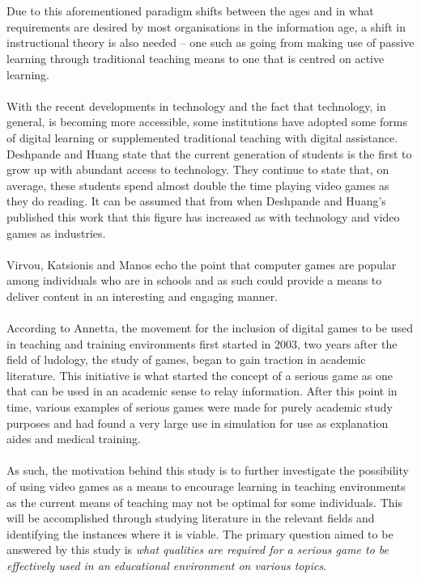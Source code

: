 \documentclass[conference]{IEEEtran}
\begin{document}
\\\\
Due to this aforementioned paradigm shifts between the ages and in what requirements are desired by most organisations in the information age, a shift in instructional theory is also needed – one such as going from making use of passive learning through traditional teaching means to one that is centred on active learning\cite{Reigeluth1996}.
\\\\
With the recent developments in technology and the fact that technology, in general, is becoming more accessible, some institutions have adopted some forms of digital learning or supplemented traditional teaching with digital assistance. Deshpande and Huang\cite{Deshpande2011} state that the current generation of students is the first to grow up with abundant access to technology. They continue to state that, on average, these students spend almost double the time playing video games as they do reading\cite{Deshpande2011}. It can be assumed that from when Deshpande and Huang’s\cite{Deshpande2011} published this work that this figure has increased as with technology and video games as industries. 
\\\\
Virvou, Katsionis and Manos\cite{Virvou2005} echo the point that computer games are popular among individuals who are in schools and as such could provide a means to deliver content in an interesting and engaging manner. 
\\\\
According to Annetta\cite{Annetta2008}, the movement for the inclusion of digital games to be used in teaching and training environments first started in 2003, two years after the field of ludology, the study of games, began to gain traction in academic literature. This initiative is what started the concept of a serious game as one that can be used in an academic sense to relay information. After this point in time, various examples of serious games were made for purely academic study purposes and had found a very large use in simulation for use as explanation aides and medical training.
\\\\
As such, the motivation behind this study is to further investigate the possibility of using video games as a means to encourage learning in teaching environments as the current means of teaching may not be optimal for some individuals. This will be accomplished through studying literature in the relevant fields and identifying the instances where it is viable. The primary question aimed to be answered by this study is \textit{what qualities are required for a serious game to be effectively used in an educational environment on various topics}.
 
\end{document}
